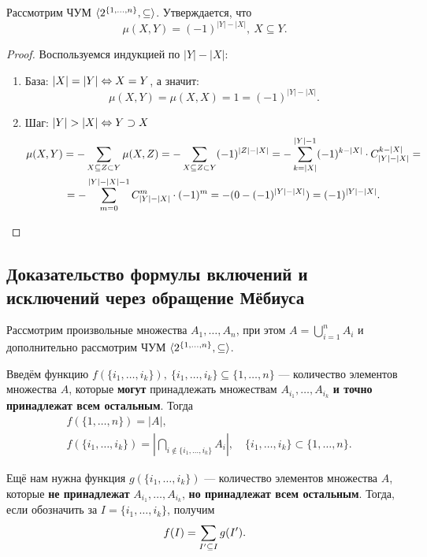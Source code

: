 \begin{theorem}
	Рассмотрим ЧУМ $\langle2^{\{1, \ldots, n\}}, \subseteq\rangle$. Утверждается, что
	\[
		\mu(X, Y) = (-1)^{|Y| - |X|},\ X \subseteq Y.
	\]
\end{theorem}

\begin{proof}
	Воспользуемся индукцией по $|Y| - |X|$:
	\begin{enumerate}
		\item База: $|X| = |Y| \Leftrightarrow X = Y$, а значит:
		\[
			\mu(X, Y) = \mu(X, X) = 1 = (-1)^{|Y| - |X|}.
		\]
		
		\item Шаг: $|Y| > |X| \Leftrightarrow Y \supset X$
		\begin{multline*}
			\mu(X, Y) = -\sum\limits_{X \subseteq Z \subset Y} \mu(X, Z) = -\sum\limits_{X \subseteq Z \subset Y} (-1)^{|Z| - |X|} = -\sum\limits_{k = |X|}^{|Y| - 1} (-1)^{k - |X|} \cdot C_{|Y| - |X|}^{k - |X|} =
			\\
			= -\sum\limits_{m = 0}^{|Y| - |X| - 1} C_{|Y| - |X|}^m \cdot (-1)^m = -(0 - (-1)^{|Y| - |X|}) = (-1)^{|Y| - |X|}.
		\end{multline*}
	\end{enumerate}
\end{proof}

\subsection{Доказательство формулы включений и исключений через обращение Мёбиуса}

Рассмотрим произвольные множества $A_1, \ldots, A_n$, при этом $A = \bigcup_{i = 1}^n A_i$ и  дополнительно рассмотрим ЧУМ $\langle2^{\{1, \ldots, n\}}, \subseteq\rangle$.

Введём функцию $f(\{i_1, \ldots, i_k\}),\ \{i_1, \ldots, i_k\} \subseteq \{1, \ldots, n\}$ --- количество элементов множества $A$, которые \textbf{могут} принадлежать множествам $A_{i_1}, \ldots, A_{i_k}$ \textbf{и точно принадлежат всем остальным}. Тогда
\begin{align*}
	&{f(\{1, \ldots, n\}) = |A|,}
	\\
	&{f(\{i_1, \ldots, i_k\}) = \left|\bigcap_{i \notin \{i_1, \ldots, i_k\}} A_i\right|,\quad \{i_1, \ldots, i_k\} \subset \{1, \ldots, n\}.}
\end{align*}

Ещё нам нужна функция $g(\{i_1, \ldots, i_k\})$ --- количество элементов множества $A$, которые \textbf{не принадлежат} $A_{i_1}, \ldots, A_{i_k}$, \textbf{но принадлежат всем остальным}. Тогда, если обозначить за $I = \{i_1, \ldots, i_k\}$, получим
\[
	f(I) = \sum\limits_{I' \subseteq I} g(I').
\]

